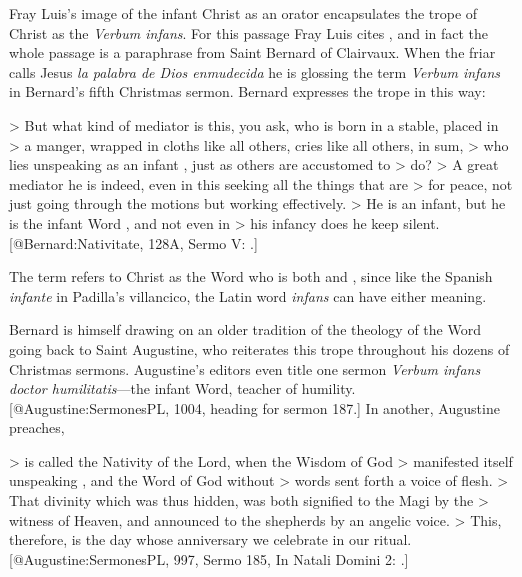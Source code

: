 Fray Luis's image of the infant Christ as an orator encapsulates the trope of
Christ as the \emph{Verbum infans}.
For this passage Fray Luis cites , and in fact the whole passage is a
paraphrase from Saint Bernard of Clairvaux.
When the friar calls Jesus \emph{la palabra de Dios enmudecida} he is glossing the
term \emph{Verbum infans} in Bernard's fifth Christmas sermon.
Bernard expresses the trope in this way:

> But what kind of mediator is this, you ask, who is born in a stable, placed in
> a manger, wrapped in cloths like all others, cries like all others, in sum,
> who lies unspeaking as an infant , just as others are accustomed to
> do?
> A great mediator he is indeed, even in this seeking all the things that are
> for peace, not just going through the motions but working effectively.
> He is an infant, but he is the infant Word , and not even in
> his infancy does he keep silent.
[@Bernard:Nativitate, 128A, Sermo V:
.]

\noindent
The term refers to Christ as the Word who is both  and ,
since like the Spanish \emph{infante} in Padilla's villancico, the Latin word
\emph{infans} can have either meaning.

Bernard is himself drawing on an older tradition of the theology of the Word
going back to Saint Augustine, who reiterates this trope throughout his dozens of
Christmas sermons.
Augustine's editors even title one sermon \emph{Verbum infans doctor humilitatis}---the
infant Word, teacher of humility.
[@Augustine:SermonesPL, 1004, heading for sermon 187.]
In another, Augustine preaches,

>  is called the Nativity of the Lord, when the Wisdom of God
> manifested itself unspeaking , and the Word of God without
> words sent forth a voice of flesh.
> That divinity which was thus hidden, was both signified to the Magi by the
> witness of Heaven, and announced to the shepherds by an angelic voice.
> This, therefore, is the day whose anniversary we celebrate in our ritual.
[@Augustine:SermonesPL, 997, Sermo 185, In Natali Domini 2:
.] 


